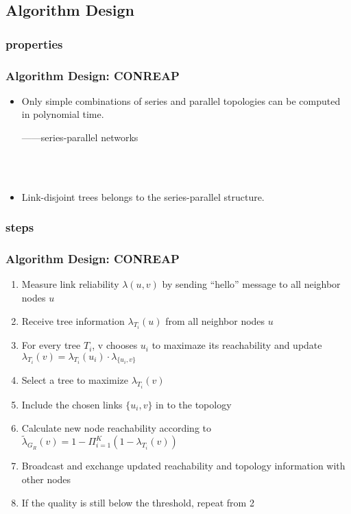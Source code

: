 \documentclass[xcolor=dvipsnames]{beamer}
\begin{document}
\subsection{Algorithm Design}
\subsubsection{properties}
\begin{frame}
\frametitle{Algorithm Design: CONREAP}
\begin{itemize}
\item Only simple combinations of series and parallel topologies can be computed in polynomial time.\\
\begin{flushright}
------series-parallel networks
\end{flushright}
\indent\\
\indent\\
\item Link-disjoint trees belongs to the series-parallel structure.
\end{itemize}
\end{frame}

\subsubsection{steps}
\begin{frame}
\frametitle{Algorithm Design: CONREAP}
\begin{enumerate}
\item<1-> Measure link reliability $\lambda(u,v) $ by sending “hello” message to all neighbor nodes $u$
\item<2-> Receive tree information $\lambda_{T_{i}}(u)$ from all neighbor nodes $u$
\item<3-> For every tree $T_{i}$, v chooses $u_{i}$ to maximaze its reachability and update $\lambda_{T_{i}}(v)=\lambda_{T_{i}}(u_{i})\cdot \lambda_{\{u_{i},v\}}$
\item<4-> Select a tree to maximize $\lambda_{T_{i}}(v)$
\item<5-> Include the chosen links $\{u_{i},v \}$ in to the topology
\item<6-> Calculate new node reachability according to $\tilde{\lambda}_{G_{R}}(v)=1-\Pi^{K}_{i=1}(1-\lambda_{T_{i}}(v))$
\item<7-> Broadcast and exchange updated reachability and topology information with other nodes
\item<8-> If the quality is still below the threshold, repeat from 2
\end{enumerate}
\end{frame}
\end{document}
